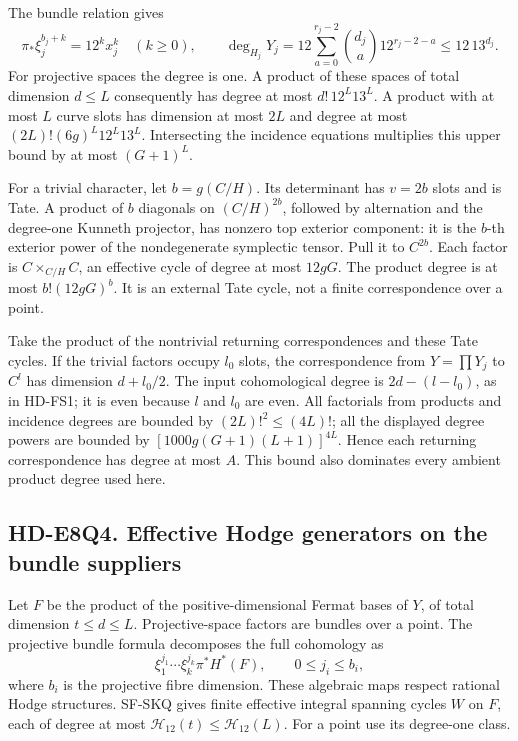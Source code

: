 The bundle relation gives
\[
 \pi_*\xi_j^{b_j+k}=12^kx_j^k\quad(k\ge0),\qquad
 \deg_{H_j}Y_j
  =12\sum_{a=0}^{r_j-2}\binom{d_j}{a}12^{r_j-2-a}
  \le12\,13^{d_j}.                                            \tag{E8Q.8}
\]
For projective spaces the degree is one. A product of these
spaces of total dimension \(d\le L\) consequently has degree
at most \(d!\,12^L13^L\). A product with at most \(L\)
curve slots has dimension at most \(2L\) and degree at most
\((2L)!(6g)^L12^L13^L\). Intersecting the incidence equations
multiplies this upper bound by at most \((G+1)^L\).

For a trivial character, let \(b=g(C/H)\). Its determinant
has \(v=2b\) slots and is Tate. A product of \(b\) diagonals
on \((C/H)^{2b}\), followed by alternation and the
degree-one Kunneth projector, has nonzero top exterior
component: it is the \(b\)-th exterior power of the
nondegenerate symplectic tensor. Pull it to \(C^{2b}\).
Each factor is \(C\times_{C/H}C\), an effective cycle
of degree at most \(12gG\). The product degree is at most
\(b!(12gG)^b\). It is an external Tate cycle, not a
finite correspondence over a point.

Take the product of the nontrivial returning correspondences
and these Tate cycles. If the trivial factors occupy \(l_0\)
slots, the correspondence from \(Y=\prod Y_j\) to \(C^l\)
has dimension \(d+l_0/2\). The input cohomological degree
is \(2d-(l-l_0)\), as in HD-FS1; it is even because
\(l\) and \(l_0\) are even. All factorials from products
and incidence degrees are bounded by
\((2L)!^2\le(4L)!\); all the displayed degree powers are
bounded by \([1000g(G+1)(L+1)]^{4L}\). Hence each returning
correspondence has degree at most \(A\). This bound also
dominates every ambient product degree used here.

\subsection*{HD-E8Q4. Effective Hodge generators on the bundle suppliers}

Let \(F\) be the product of the positive-dimensional Fermat
bases of \(Y\), of total dimension \(t\le d\le L\).
Projective-space factors are bundles over a point. The
projective bundle formula decomposes the full cohomology as
\[
 \xi_1^{j_1}\cdots\xi_k^{j_k}\pi^*H^*(F),
                    \qquad 0\le j_i\le b_i,                  \tag{E8Q.9}
\]
where \(b_i\) is the projective fibre dimension. These
algebraic maps respect rational Hodge structures.
SF-SKQ gives finite effective integral spanning cycles
\(W\) on \(F\), each of degree at most
\(\mathcal H_{12}(t)\le\mathcal H_{12}(L)\).
For a point use its degree-one class.

